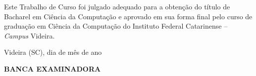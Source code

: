 \begin{folhadeaprovacao}

  \begin{center}
  \vspace*{-1.2cm}
    \textbf{\large\imprimirautor}
    
    \vspace*{\fill}\vspace*{\fill}\vspace*{\fill}
    \parbox{15cm}{
        \OnehalfSpacing\centering\large\textbf{\imprimirtitulo}
    }
    \vspace*{\fill}\vspace*{\fill}
    
    \hspace{.45\textwidth}
    \begin{minipage}{.5\textwidth}
        Este Trabalho de Curso foi julgado
        adequado para a obtenção do título de
        Bacharel em Ciência da Computação e
        aprovado em sua forma final pelo curso de
        graduação em Ciência da Computação do Instituto Federal Catarinense
        – \textit{Campus} Videira. 

    \end{minipage}%
    \vspace*{\fill}
   \end{center}
    \vspace{-1cm}
  \begin{center}
  	 Videira (SC), dia de mês de ano
  \end{center}
  


  
   			  
    \begin{center}
  	\textbf{ BANCA EXAMINADORA}
   \end{center}
    

    \vspace*{1cm}
  
\end{folhadeaprovacao}